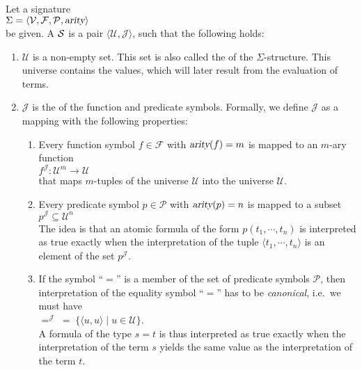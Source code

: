 \begin{Definition}[Structure]
    Let a signature \\[0.2cm]
    \hspace*{1.3cm} $\Sigma = \langle \mathcal{V}, \mathcal{F}, \mathcal{P}, \textsl{arity} \rangle$ \\[0.2cm]
    be given. A  $\mathcal{S}$ is a
    pair $\langle \mathcal{U}, \mathcal{J} \rangle$, such that the following holds:
    \begin{enumerate}
        \item $\mathcal{U}$ is a non-empty set. This set is also called the
                of the $\Sigma$-structure. This universe contains the values,
              which will later result from the evaluation of terms.
        \item $\mathcal{J}$ is the   of the function and predicate symbols.
              Formally, we define $\mathcal{J}$ as a mapping with the following properties:
        \begin{enumerate}
        \item Every function symbol $f \in \mathcal{F}$ with $\textsl{arity}(f) = m$ is mapped to
              an $m$-ary function \\[0.2cm]
              \hspace*{1.3cm}
              $f^\mathcal{J}\colon \mathcal{U}^m \rightarrow \mathcal{U}$ \\[0.2cm]
              that maps $m$-tuples of the universe $\mathcal{U}$ into the universe $\mathcal{U}$.
        \item Every predicate symbol $p \in \mathcal{P}$ with $\textsl{arity}(p) = n$ is mapped to
              a subset \\[0.2cm]
              \hspace*{1.3cm} 
              $p^\mathcal{J} \subseteq \mathcal{U}^n$ \\[0.2cm]
              The idea is that an atomic formula of the form $p(t_1, \cdots, t_n)$
              is interpreted as true exactly when the interpretation of the tuple
              $\langle t_1, \cdots, t_n \rangle$ is an element of the set $p^\mathcal{J}$.
        \item If the symbol ``$=$'' is a member of the set of predicate symbols $\mathcal{P}$, then
              interpretation of  the equality symbol ``$=$'' has to be \emph{canonical}, i.e.~we must have
              \\[0.2cm]
              \hspace*{1.3cm}  
              $=^\mathcal{J} \;=\; \bigl\{ \langle u, u \rangle \mid u \in \mathcal{U} \bigr\}$.
              \\[0.2cm]
              A formula of the type $s = t$ is thus interpreted as true 
              exactly when the interpretation of the term $s$ yields the same value as the interpretation of
              the term $t$. 
              \eox
        \end{enumerate}
    \end{enumerate}
\end{Definition}

